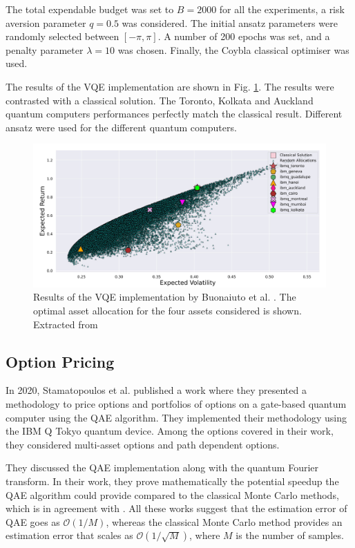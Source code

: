 \documentclass[prx,twocolumn,floatfix,superscriptaddress,longbibliography]{revtex4-1}
\begin{document}
The total expendable budget was set to $B=2000$ for all the experiments, a risk aversion parameter $q=0.5$ was considered. The initial ansatz parameters were randomly selected between $[-\pi, \pi]$. A number of 200 epochs was set, and a penalty parameter $\lambda=10$  was chosen. Finally, the Coybla classical optimiser was used. 

The results of the VQE implementation are shown in Fig. \ref{fig:results}. The results were contrasted with a classical solution. The Toronto, Kolkata and Auckland quantum computers performances perfectly match the classical result. Different ansatz were used for the different quantum computers. 
\begin{figure}[t!]
\centering
\includegraphics[width=.90\textwidth]{results-vqe.png}
  \caption{\label{fig:results} Results of the VQE implementation by Buonaiuto et al. \cite{Buonaiuto2023}. The optimal asset allocation for the four assets considered is shown. Extracted from 
  \cite{Buonaiuto2023}}
\end{figure}

\subsection{Option Pricing}
In 2020, Stamatopoulos et al. \cite{Stamatopoulos2020} published a work where they presented a methodology to price options and portfolios of options on a gate-based quantum computer using the QAE algorithm. They implemented their methodology using the IBM Q Tokyo quantum device. Among 
the options covered in their work, they considered multi-asset options and path dependent options.

They discussed the QAE implementation along with the quantum Fourier transform. In their work, they prove mathematically the potential speedup the QAE algorithm could provide compared to the classical Monte Carlo methods, which is in agreement with \cite{Woerner2019, Nakaji2020,Rebentrost2018, Rebentrost2022}. All these works suggest that the estimation error of QAE goes as $\mathcal{O}(1/M)$, whereas the classical Monte Carlo method provides an estimation error that scales as $\mathcal{O}(1/\sqrt{M})$, where $M$ is the number of samples.
\end{document}
